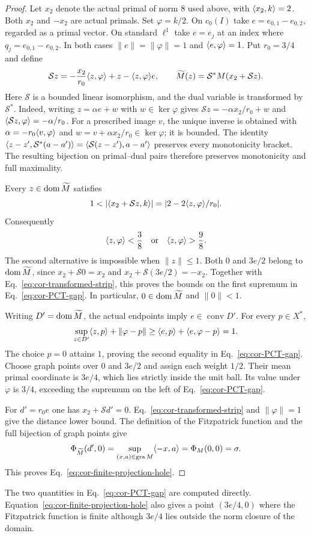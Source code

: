 \begin{proof}
Let $x_2$ denote the actual primal of norm $8$ used above, with
$\langle x_2,k\rangle=2$. Both $x_2$ and $-x_2$ are actual primals.
Set $\varphi=k/2$. On $c_0(I)$ take
$e=e_{0,1}-e_{0,2}$, regarded as a primal vector. On standard
$\ell^1$ take $e=e_j$ at an index where
$q_j=e_{0,1}-e_{0,2}$. In both cases
$\|e\|=\|\varphi\|=1$ and $\langle e,\varphi\rangle=1$.
Put $r_0=3/4$ and define
\[
\mathcal S z=-\frac{x_2}{r_0}\langle z,\varphi\rangle
                 +z-\langle z,\varphi\rangle e,
\qquad
\widetilde M(z)=\mathcal S^*M(x_2+\mathcal S z).
\]
Here $\mathcal S$ is a bounded linear isomorphism, and the dual variable
is transformed by $\mathcal S^*$. Indeed, writing $z=\alpha e+w$ with $w\in\ker\varphi$
gives $\mathcal S z=-\alpha x_2/r_0+w$ and
$\langle \mathcal S z,\varphi\rangle=-\alpha/r_0$. For a prescribed
image $v$, the unique inverse is obtained with
$\alpha=-r_0\langle v,\varphi\rangle$ and
$w=v+\alpha x_2/r_0\in\ker\varphi$; it is bounded.
The identity $\langle z-z',\mathcal S^*(a-a')\rangle
=\langle \mathcal S(z-z'),a-a'\rangle$ preserves every monotonicity bracket.
The resulting bijection on primal--dual pairs therefore preserves
monotonicity and full maximality.

Every $z\in\operatorname{dom}\widetilde M$ satisfies
\[
1<|\pair{x_2+\mathcal S z}{k}|
  =|2-2\pair{z}{\varphi}/r_0|.
\]
Consequently
\begin{equation}
\langle z,\varphi\rangle<\frac38
\quad\text{or}\quad
\langle z,\varphi\rangle>\frac98.
\label{eq:cor-transformed-strip}
\end{equation}
The second alternative is impossible when $\|z\|\le1$.
Both $0$ and $3e/2$ belong to $\operatorname{dom}\widetilde M$, since
$x_2+\mathcal S0=x_2$ and $x_2+\mathcal S(3e/2)=-x_2$.
Together with Eq.~\eqref{eq:cor-transformed-strip}, this proves the bounds
on the first supremum in Eq.~\eqref{eq:cor-PCT-gap}. In particular,
$0\in\operatorname{dom}\widetilde M$ and $\|0\|<1$.

Writing $D'=\operatorname{dom}\widetilde M$, the actual endpoints imply
$e\in\operatorname{conv}D'$. For every $p\in X^*$,
\[
\sup_{z\in D'}\langle z,p\rangle+\|\varphi-p\|
\ge\langle e,p\rangle+\langle e,\varphi-p\rangle=1.
\]
The choice $p=0$ attains $1$, proving the second equality in
Eq.~\eqref{eq:cor-PCT-gap}. Choose graph points over $0$ and $3e/2$
and assign each weight $1/2$. Their mean primal coordinate is $3e/4$,
which lies strictly inside the unit ball. Its value under $\varphi$
is $3/4$, exceeding the supremum on the left of
Eq.~\eqref{eq:cor-PCT-gap}.

For $d'=r_0e$ one has $x_2+\mathcal S d'=0$.
Eq.~\eqref{eq:cor-transformed-strip} and $\|\varphi\|=1$
give the distance lower bound. The definition of the Fitzpatrick
function and the full bijection of graph points give
\[
\Phi_{\widetilde M}(d',0)
=\sup_{(x,a)\in\operatorname{gra} M}\langle -x,a\rangle
=\Phi_M(0,0)=\sigma.
\]
This proves Eq.~\eqref{eq:cor-finite-projection-hole}.
\end{proof}
The two quantities in Eq.~\eqref{eq:cor-PCT-gap} are computed directly.
Equation~\eqref{eq:cor-finite-projection-hole} also gives a point
$(3e/4,0)$ where the Fitzpatrick function is finite although $3e/4$
lies outside the norm closure of the domain.

